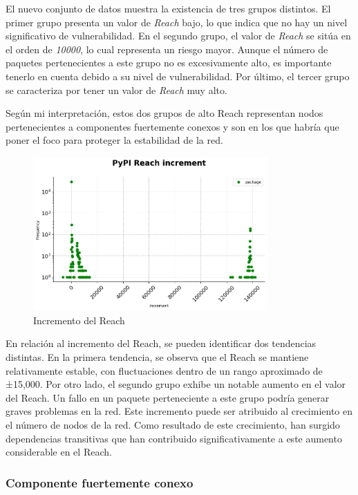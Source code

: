 El nuevo conjunto de datos muestra la existencia de tres grupos distintos. El primer grupo presenta
un valor de \textit{Reach} bajo, lo que indica que no hay un nivel significativo de vulnerabilidad. En el
segundo grupo, el valor de \textit{Reach} se sitúa en el orden de \textit{10000}, lo cual representa un riesgo mayor.
Aunque el número de paquetes pertenecientes a este grupo no es excesivamente alto, es importante
tenerlo en cuenta debido a su nivel de vulnerabilidad. Por último, el tercer grupo se caracteriza
por tener un valor de \textit{Reach} muy alto.

Según mi interpretación, estos dos grupos de alto Reach representan nodos pertenecientes a componentes
fuertemente conexos y son en los que habría que poner el foco para proteger la estabilidad de la red.

\begin{figure}[h!]
    \begin{center}
        \includegraphics[width=0.8\textwidth]{img/pypi/reach_increment.png}
        \caption{Incremento del Reach}
    \end{center}
\end{figure}

En relación al incremento del Reach, se pueden identificar dos tendencias distintas. En la primera
tendencia, se observa que el Reach se mantiene relativamente estable, con fluctuaciones dentro de un
rango aproximado de ±15,000. Por otro lado, el segundo grupo exhibe un notable aumento en el valor
del Reach. Un fallo en un paquete perteneciente a este grupo podría generar graves problemas en la red.
Este incremento puede ser atribuido al crecimiento en el número de nodos de la red. Como resultado de
este crecimiento, han surgido dependencias transitivas que han contribuido significativamente a este
aumento considerable en el Reach.

\subsubsection{Componente fuertemente conexo}

